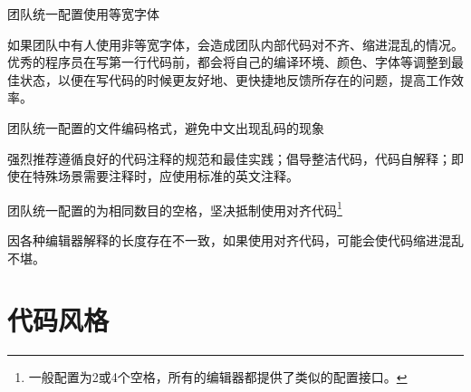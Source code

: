 \begin{content}
\begin{regulation}
团队统一配置使用等宽字体
\end{regulation}

如果团队中有人使用非等宽字体，会造成团队内部代码对不齐、缩进混乱的情况。优秀的程序员在写第一行代码前，都会将自己的编译环境、颜色、字体等调整到最佳状态，以便在写代码的时候更友好地、更快捷地反馈所存在的问题，提高工作效率。

\begin{regulation}
团队统一配置的文件编码格式，避免中文出现乱码的现象
\end{regulation}

强烈推荐遵循良好的代码注释的规范和最佳实践；倡导整洁代码，代码自解释；即使在特殊场景需要注释时，应使用标准的英文注释。

\begin{regulation}
团队统一配置的为相同数目的空格，坚决抵制使用对齐代码\footnote{一般配置为2或4个空格，所有的编辑器都提供了类似的配置接口。}
\end{regulation}

因各种编辑器解释的长度存在不一致，如果使用对齐代码，可能会使代码缩进混乱不堪。

\end{content}

\section{代码风格}

